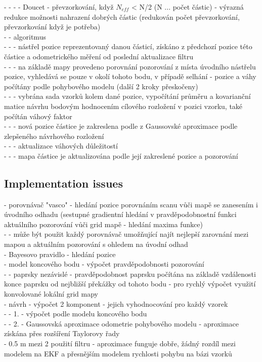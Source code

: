 \documentclass[11pt]{article}
\begin{document}
- - - - Doucet - převzorkování, když $N_{eff}$ < N/2 (N ... počet částic) - výrazná redukce možnosti nahrazení dobrých částic (redukován počet převzorkování, převzorkování když je potřeba)\\
 - - algoritmus\\
 - - - nástřel pozice reprezentovaný danou částicí, získáno z předchozí pozice této částice a odometrického měření od poslední aktualizace filtru\\
 - - - na základě mapy provedeno porovnání pozorování z místa úvodního nástřelu pozice, vyhledává se pouze v okolí tohoto bodu, v případě selhání - pozice a váhy počítány podle pohybového modelu (další 2 kroky přeskočeny)\\
 - - - vybrána sada vzorků kolem dané pozice, vypočítání průměru a kovarianční matice návrhu bodovým hodnocením cílového rozložení v pozici vzorku, také počítán váhový faktor\\
 - - -  nová pozice částice je zakreslena podle z Gaussovské aproximace podle zlepšeného návrhového rozložení\\
 - - - aktualizace váhových důležitostí\\
 - - - mapa částice je aktualizována podle její zakreslené pozice a pozorování\\
 
\subsection{Implementation issues}
 - porovnávač "vasco" - hledání pozice porovnáním scanu vůči mapě se zanesením i úvodního odhadu (sestupné gradientní hledání v pravděpodobnostní funkci aktuálního pozorování vůči grid mapě - hledání maxima funkce)\\
 - - může být použit každý porovnávač umožňující najít nejlepší zarovnání mezi mapou a aktuálním pozorování s ohledem na úvodní odhad\\
 - Bayesovo pravidlo - hledání pozice\\
 - model koncového bodu - výpočet pravděpodobnosti pozorování\\
 - - paprsky nezávislé - pravděpodobnost paprsku počítána na základě vzdálenosti konce paprsku od nejbližší překážky od tohoto bodu - pro rychlý výpočet využití konvolované lokální grid mapy\\
 - návrh - výpočet 2 komponent - jejich vyhodnocování pro každý vzorek\\
 - - 1. - výpočet podle modelu koncového bodu\\
 - - 2. - Gaussovská aproximace odometrie pohybového modelu - aproximace získána přes rozšíření Taylorovy řady\\
 - 0.5 m mezi 2 použití filtru - aproximace funguje dobře, žádný rozdíl mezi modelem na EKF a přesnějším  modelem rychlosti pohybu na bázi vzorků\\
\end{document}
